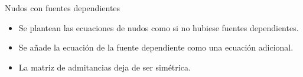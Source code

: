 \documentclass[aspectratio=169, usenames,svgnames,dvipsnames]{beamer}
\begin{document}
\begin{frame}[label={sec:org2214af0}]{Nudos con fuentes dependientes}
\begin{itemize}
\item Se plantean las ecuaciones de nudos como si no hubiese fuentes dependientes.
\item Se añade la ecuación de la fuente dependiente como una ecuación adicional.
\item La matriz de admitancias deja de ser simétrica.
\end{itemize}
\end{frame}
\end{document}
